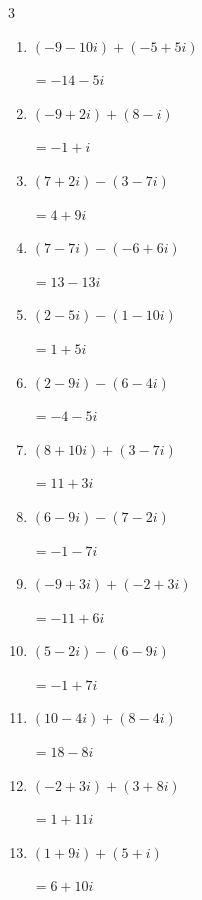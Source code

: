\begin{multicols}{3}
\begin{enumerate}
        $\displaystyle =-17-4i$

  \item $\displaystyle (-9-10i) + (-5+5i)$

        $\displaystyle =-14-5i$

  \item $\displaystyle (-9+2i) + (8-i)$

        $\displaystyle =-1+i$

  \item $\displaystyle (7+2i) - (3-7i)$

        $\displaystyle =4+9i$

  \item $\displaystyle (7-7i) - (-6+6i)$

        $\displaystyle =13-13i$

  \item $\displaystyle (2-5i) - (1-10i)$

        $\displaystyle =1+5i$

  \item $\displaystyle (2-9i) - (6-4i)$

        $\displaystyle =-4-5i$

  \item $\displaystyle (8+10i) + (3-7i)$

        $\displaystyle =11+3i$

  \item $\displaystyle (6-9i) - (7-2i)$

        $\displaystyle =-1-7i$

  \item $\displaystyle (-9+3i) + (-2+3i)$

        $\displaystyle =-11+6i$

  \item $\displaystyle (5-2i) - (6-9i)$

        $\displaystyle =-1+7i$

  \item $\displaystyle (10-4i) + (8-4i)$

        $\displaystyle =18-8i$

  \item $\displaystyle (-2+3i) + (3+8i)$

        $\displaystyle =1+11i$

  \item $\displaystyle (1+9i) + (5+i)$

        $\displaystyle =6+10i$

\columnbreak %


\end{enumerate}
\end{multicols}
